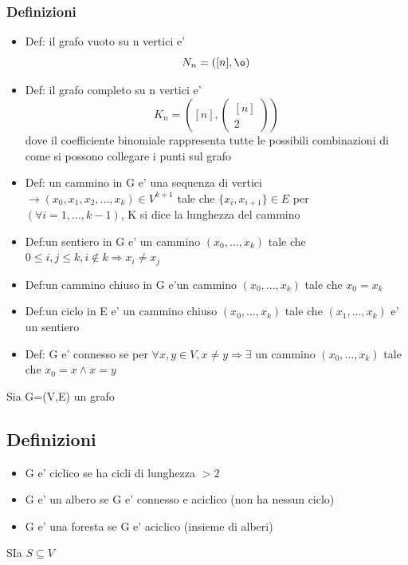 \documentclass{article}
\begin{document}
        \subsubsection*{Definizioni}
        \begin{itemize}
          \item Def: il grafo vuoto su n vertici e'
            \begin{equation*}
              N_n=([n],\o)
            \end{equation*}
          \item Def: il grafo completo su n vertici e'
            \begin{equation*}
              K_n=([n],\begin{pmatrix}
                [n] \\ 2
              \end{pmatrix})
            \end{equation*} dove il coefficiente binomiale rappresenta tutte le possibili combinazioni di come si possono collegare i punti sul grafo
          \item Def: un cammino in G e' una sequenza di vertici $\to (x_0,x_1,x_2,...,x_k)\in V^{k+1}$ tale che $\{x_i,x_{i+1}\}\in E$ per $(\forall i=1,...,k-1)$,
            K si dice la lunghezza del cammino
          \item Def:un sentiero in G e' un cammino $(x_0,...,x_k)$ tale che $0\leq i, j\leq k,i \notin k \Rightarrow x_i \neq x_j$
          \item Def:un cammino chiuso in G e'un cammino $(x_0,...,x_k)$ tale che $x_0=x_k$
          \item Def:un ciclo in E e' un cammino chiuso $(x_0,...,x_k)$ tale che $(x_1,...,x_k)$ e' un sentiero
          \item Def: G e' connesso se per $\forall x,y \in V, x\neq y \Rightarrow \exists$ un cammino $(x_0,...,x_k)$ tale che $x_0=x \land x=y$
        \end{itemize}
        \begin{flushleft}
          Sia G=(V,E) un grafo
        \end{flushleft}
        \subsection*{Definizioni}
        \begin{itemize}
          \item G e' ciclico se ha cicli di lunghezza $>2$
          \item G e' un albero se G e' connesso e aciclico (non ha nessun ciclo)
          \item G e' una foresta se G e' aciclico (insieme di alberi)
        \end{itemize}
        \begin{flushleft}
          SIa $S \subseteq V$
        \end{flushleft}
\end{document}
